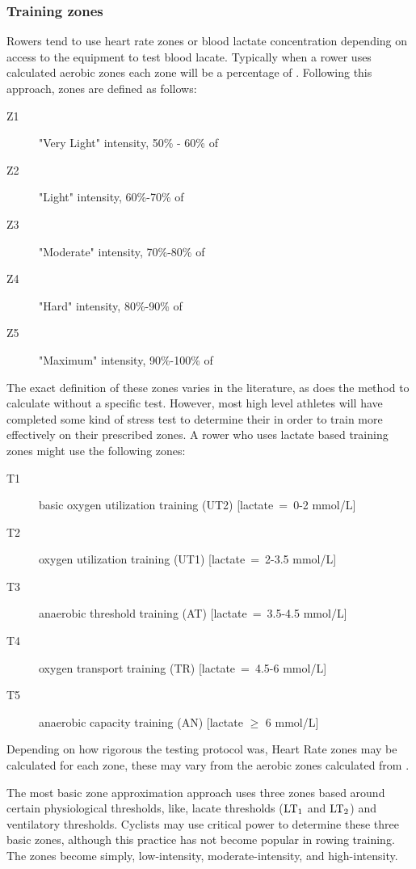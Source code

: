 \subsubsection{Training zones}
Rowers tend to use heart rate zones or blood lactate concentration depending on access to the equipment to test blood lacate. Typically when a rower uses calculated aerobic zones each zone will be a percentage of \maxHR. Following this approach, zones are defined as follows:
\begin{description}
  \item[Z1] "Very Light" intensity, 50\% - 60\% of \maxHR
  \item[Z2] "Light" intensity, 60\%-70\% of \maxHR
  \item[Z3] "Moderate" intensity, 70\%-80\% of \maxHR
  \item[Z4] "Hard" intensity, 80\%-90\% of \maxHR
  \item[Z5] "Maximum" intensity, 90\%-100\% of \maxHR
\end{description}
The exact definition of these zones varies in the literature, as does the method to calculate \maxHR without a specific test. However, most high level athletes will have completed some kind of stress test to determine their \maxHR in order to train more effectively on their prescribed zones.
A rower who uses lactate based training zones might use the following zones:
\begin{description}
  \item[T1]  basic oxygen utilization training (UT2) [lactate~=~0-2 mmol/L]
  \item[T2]  oxygen utilization training (UT1) [lactate~=~2-3.5 mmol/L]
  \item[T3]  anaerobic threshold training (AT) [lactate~=~3.5-4.5 mmol/L]
  \item[T4]  oxygen transport training (TR) [lactate~=~4.5-6 mmol/L]
  \item[T5]  anaerobic capacity training (AN) [lactate $\geq$ 6 mmol/L] \autocite{Das2022}
\end{description}
Depending on how rigorous the testing protocol was, Heart Rate zones may be calculated for each zone, these may vary from the aerobic zones calculated from \maxHR.

The most basic zone approximation approach uses three zones based around certain physiological thresholds, like, lacate thresholds ($\textnormal{LT}_\text{1}$ and $\textnormal{LT}_\text{2}$) and ventilatory thresholds. Cyclists may use critical power to determine these three basic zones, although this practice has not become popular in rowing training. The zones become simply, low-intensity, moderate-intensity, and high-intensity. 

